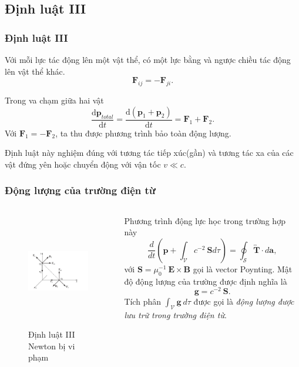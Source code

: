 \subsection{Định luật III}
\begin{frame}
    \frametitle{Định luật III}
    \begin{tcolorbox}[colback=blue!10, colframe=blue!50!black]
        Với mỗi lực tác động lên một vật thể, có một lực bằng và ngược chiều tác động lên vật thể khác.
        \begin{equation}
            \mathbf{F}_{ij}=-\mathbf{F}_{ji}.
        \end{equation}
    \end{tcolorbox}
    Trong va chạm giữa hai vật \[\frac{\text{d}\mathbf{p}_{total}}{\text{d}t}=\frac{\text{d}(\mathbf{p}_1 +\mathbf{p}_2)}{\text{d}t}=\mathbf{F}_1 +\mathbf{F}_2.\] Với \(\mathbf{F}_1 =-\mathbf{F}_2\), ta thu được phương trình bảo toàn động lượng.

    Định luật này nghiệm đúng với tương tác tiếp xúc(gần) và tương tác xa của các vật đứng yên hoặc chuyển động với vận tốc \(v\ll c\). 
\end{frame}
\begin{frame}
    \frametitle{Động lượng của trường điện từ}
    \begin{columns}
        \begin{column}{0.5\textwidth}
            \vspace{-8pt}

            \begin{figure}
        \centering
        \includegraphics[width=7cm, height=5cm]{Slides/Figure/thirdlawinelectromagne.jpg}
        \caption{Định luật III Newton bị vi phạm}
    \end{figure}
        \end{column}
        \begin{column}{0.5\textwidth}
            Phương trình động lực học trong trường hợp này
            \[\frac{d}{dt}\left(\mathbf{p}+\int_{\mathcal{V}}c^{-2}~\mathbf{S}d\tau\right)=\oint_{\mathcal{S}}\overleftrightarrow{\mathbf{T}}\cdot d\mathbf{a},\]
            với \(\mathbf{S}=\mu_0^{-1}~\mathbf{E}\times\mathbf{B}\) gọi là vector Poynting. \newline Mật độ động lượng của trường được định nghĩa là 
            \[\mathbf{g}=c^{-2}~\mathbf{S}.\]
            Tích phân \(\int_{\mathcal{V}}\mathbf{g}~d\tau\) được gọi là \emph{động lượng được lưu trữ trong trường điện từ}.
        \end{column}
    \end{columns}
\end{frame}





 